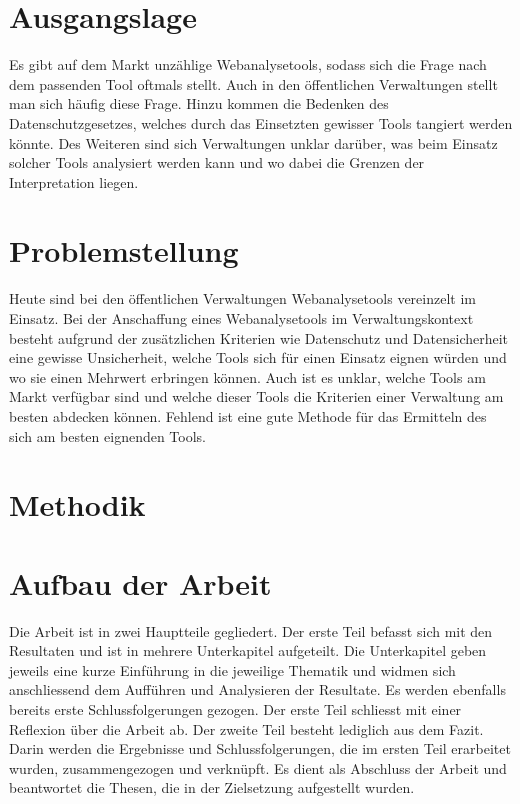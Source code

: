 
\section{Ausgangslage}
Es gibt auf dem Markt unzählige Webanalysetools, sodass sich die Frage nach dem passenden Tool oftmals stellt. Auch in den öffentlichen Verwaltungen stellt man sich häufig diese Frage. Hinzu kommen die Bedenken des Datenschutzgesetzes, welches durch das Einsetzten gewisser Tools tangiert werden könnte. Des Weiteren sind sich Verwaltungen unklar darüber, was beim Einsatz solcher Tools analysiert werden kann und wo dabei die Grenzen der Interpretation liegen.

\section{Problemstellung}

Heute sind bei den öffentlichen Verwaltungen Webanalysetools vereinzelt im Einsatz. Bei der Anschaffung eines Webanalysetools im Verwaltungskontext besteht aufgrund der zusätzlichen Kriterien wie Datenschutz und Datensicherheit eine gewisse Unsicherheit, welche Tools sich für einen Einsatz eignen würden und wo sie einen Mehrwert erbringen können. Auch ist es unklar, welche Tools am Markt verfügbar sind und welche dieser Tools die Kriterien einer Verwaltung am besten abdecken können. Fehlend ist eine gute Methode für das Ermitteln des sich am besten eignenden Tools.

\section{Methodik}


\section{Aufbau der Arbeit}

Die Arbeit ist in zwei Hauptteile gegliedert. 
Der erste Teil befasst sich mit den Resultaten und ist in mehrere Unterkapitel aufgeteilt. Die Unterkapitel geben jeweils eine kurze Einführung in die jeweilige Thematik und widmen sich anschliessend dem Aufführen und Analysieren der Resultate. Es werden ebenfalls bereits erste Schlussfolgerungen gezogen. Der erste Teil schliesst mit einer Reflexion über die Arbeit ab. 
Der zweite Teil besteht lediglich aus dem Fazit. Darin werden die Ergebnisse und Schlussfolgerungen, die im ersten Teil erarbeitet wurden, zusammengezogen und verknüpft. Es dient als Abschluss der Arbeit und beantwortet die Thesen, die in der Zielsetzung aufgestellt wurden. 